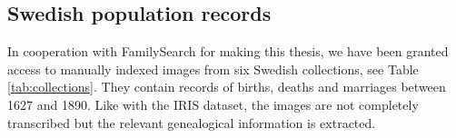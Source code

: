 \subsection{Swedish population records}



In cooperation with FamilySearch for making this thesis, we have been granted access to manually indexed images from six Swedish collections, see Table \ref{tab:collections}. They contain records of births, deaths and marriages between 1627 and 1890. Like with the IRIS dataset, the images are not completely transcribed but the relevant genealogical information is extracted.
